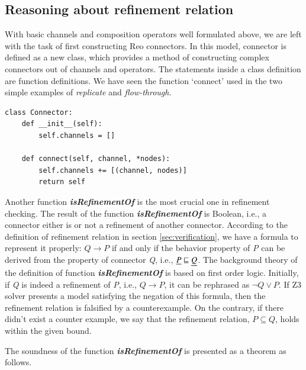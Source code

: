 \documentclass[3p,times]{elsarticle}
\begin{document}
\subsection{Reasoning about refinement relation}
With basic channels and composition operators well formulated above, we are left with the task of first constructing Reo connectors. In this model, connector is defined as a new class, which provides a method of constructing complex connectors out of channels and operators.
The statements inside a class definition are function definitions. We have seen the function `connect' used in the two simple examples of \emph{replicate} and \emph{flow-through}.
\begin{lstlisting}[frame=single]
class Connector:
    def __init__(self):
        self.channels = []

    def connect(self, channel, *nodes):
        self.channels += [(channel, nodes)]
        return self
\end{lstlisting}
Another function \textbf{\emph{isRefinementOf}} is the most crucial one in refinement checking. The result of the function \textbf{\emph{isRefinementOf}} is Boolean, i.e., a connector either is or not a refinement of another connector. According to the definition of refinement relation in section \ref{sec:verification}, we have a formula to represent it properly: $Q \rightarrow P$ if and only if the behavior property of \emph{P} can be derived from the property of connector \emph{Q}, i.e., $\emph{P} \sqsubseteq \emph{Q}$. The background theory of the definition of function  \textbf{\emph{isRefinementOf}} is based on first order logic. Initially, if \emph{Q} is indeed a refinement of \emph{P}, i.e., $Q \rightarrow P$, it can be rephrased as $\neg Q \vee P$. If Z3 solver presents a model satisfying the negation of this formula, then the refinement relation is falsified by a counterexample. On the contrary, if there didn't exist a counter example, we say that the refinement relation, $P\subseteq Q$, holds within the given bound. 

The soundness of the function \textbf{\emph{isRefinementOf}} is presented as a theorem as follows. 
\end{document}
